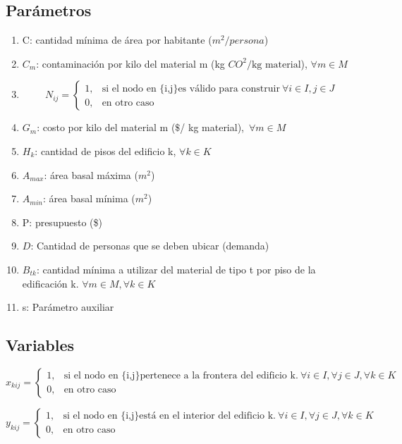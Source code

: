 \documentclass[letterpaper]{article}
\begin{document}
\subsection{Parámetros}
\begin{enumerate}
	\item C: cantidad mínima de área por habitante ($m^2/persona$)
	\item $C_{m}$: contaminación por kilo del material m (kg $CO^{2}/ \text{kg material}$), $\forall m \in M$
	\item $$
	N_{ij}=\begin{cases}
				1, & \text{si el nodo en \{i,j\} es válido para construir}\ \forall i \in I, j \in J\\
				0, & \text{en otro caso}
			 \end{cases}
	$$
	\item $G_{m}$: costo por kilo del material m ($\$$/ kg material),\ $\forall m \in M$
	\item $H_{k}$: cantidad de pisos del edificio k, $\forall k \in K$
	\item $A_{max}$: área basal máxima ($m^2$)
	\item $A_{min}$: área basal mínima ($m^2$)
	\item P: presupuesto (\$)
	\item $D$: Cantidad de personas que se deben ubicar (demanda)
	\item $B_{tk}$: cantidad mínima a utilizar del material de tipo t por piso de la edificación k. $\forall m \in M, \forall k \in K$
 	\item s: Parámetro auxiliar
\end{enumerate}


\subsection{Variables}
$$
x_{kij}=\begin{cases}
			1, & \text{si el nodo en \{i,j\} pertenece a la frontera del edificio k.}\ \forall i \in I,\forall j \in J,\forall k \in K\\
            0, & \text{en otro caso}
		 \end{cases}
$$

$$
y_{kij}=\begin{cases}
			1, & \text{si el nodo en \{i,j\} está en el interior del edificio k.}\ \forall i \in I,\forall j \in J,\forall k \in K\\
            0, & \text{en otro caso}
		 \end{cases}
$$
\end{document}
